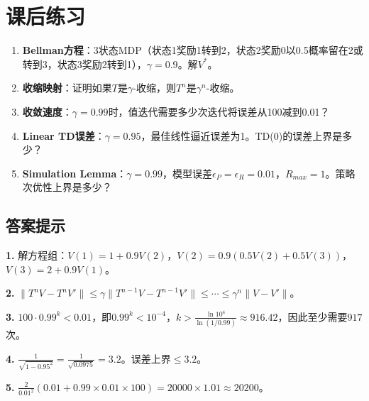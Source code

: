 \documentclass[11pt,a4paper]{article}
\theoremstyle{definition}
\begin{document}
\section*{课后练习}

\begin{enumerate}
    \item \textbf{Bellman方程}：3状态MDP（状态1奖励1转到2，状态2奖励0以0.5概率留在2或转到3，状态3奖励2转到1），$\gamma=0.9$。解$V^*$。
    
    \item \textbf{收缩映射}：证明如果$T$是$\gamma$-收缩，则$T^n$是$\gamma^n$-收缩。
    
    \item \textbf{收敛速度}：$\gamma=0.99$时，值迭代需要多少次迭代将误差从100减到0.01？
    
    \item \textbf{Linear TD误差}：$\gamma=0.95$，最佳线性逼近误差为1。TD(0)的误差上界是多少？
    
    \item \textbf{Simulation Lemma}：$\gamma=0.99$，模型误差$\epsilon_P = \epsilon_R = 0.01$，$R_{max}=1$。策略次优性上界是多少？
\end{enumerate}

\subsection*{答案提示}

\textbf{1.} 解方程组：$V(1) = 1 + 0.9V(2)$，$V(2) = 0.9(0.5V(2) + 0.5V(3))$，$V(3) = 2 + 0.9V(1)$。

\textbf{2.} $\|T^n V - T^n V'\| \leq \gamma\|T^{n-1}V - T^{n-1}V'\| \leq \cdots \leq \gamma^n\|V-V'\|$。

\textbf{3.} $100 \cdot 0.99^k < 0.01$，即$0.99^k < 10^{-4}$，$k > \frac{\ln 10^4}{\ln(1/0.99)} \approx 916.42$，因此至少需要$917$次。

\textbf{4.} $\frac{1}{\sqrt{1-0.95^2}} = \frac{1}{\sqrt{0.0975}} = 3.2$。误差上界$\leq 3.2$。

\textbf{5.} $\frac{2}{0.01^2}(0.01 + 0.99 \times 0.01 \times 100) = 20000 \times 1.01 \approx 20200$。
\end{document}
